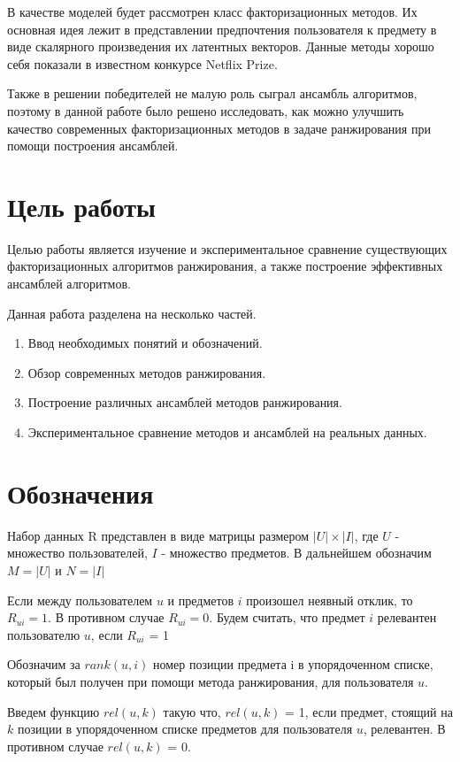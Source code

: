 \documentclass[14pt]{extarticle}
\begin{document}
В качестве моделей будет рассмотрен класс факторизационных методов. Их основная идея лежит в представлении предпочтения пользователя к предмету  в виде скалярного произведения их латентных векторов\cite{matrixfactorization}.  Данные методы хорошо себя показали в известном конкурсе Netflix Prize\cite{netflix}.

Также в решении победителей не малую роль сыграл ансамбль алгоритмов, поэтому в данной работе было  решено исследовать, как можно улучшить качество современных факторизационных методов в задаче ранжирования при помощи  построения ансамблей. 

\section{Цель работы}
Целью работы является изучение и экспериментальное сравнение существующих факторизационных алгоритмов ранжирования, а также построение  эффективных  ансамблей алгоритмов. 


Данная работа  разделена на несколько частей.
\begin{enumerate}
\item Ввод необходимых понятий и обозначений.
\item Обзор современных методов ранжирования.
\item Построение различных ансамблей методов ранжирования.
\item Экспериментальное сравнение методов и ансамблей на реальных данных.
\end{enumerate}


\section{Обозначения}

Набор данных R представлен в виде матрицы  размером $|U| \times |I|$, где $U$ - множество пользователей,  $I$ - множество предметов. В дальнейшем обозначим $M = |U| $ и $N = |I|$

Если между пользователем $u$ и предметов $i$ произошел неявный отклик, то $R_{ui}=1$. В противном случае $R_{ui} = 0$. Будем считать, что предмет $i$ релевантен пользователю $u$, если $R_{ui}$ = 1


Обозначим за $rank(u, i)$ номер позиции предмета i в упорядоченном списке, который был получен при помощи метода ранжирования, для пользователя $u$.   

Введем функцию $rel(u, k)$ такую что, $rel(u, k)$ = 1, если предмет, стоящий на $k$ позиции в упорядоченном списке предметов для пользователя $u$, релевантен. В противном случае $rel(u, k)$ = 0.  
\end{document}
